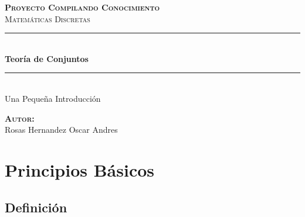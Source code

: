 \documentclass[12pt]{report}                                %
\author{Oscar Andrés Rosas}                                 %
\begin{document}
\begin{titlepage}

	\center
	\textbf{\textsc{\Large Proyecto Compilando Conocimiento}}\\[1.0cm] 
	\textsc{\Large Matemáticas Discretas}\\[1.0cm] 

	\rule{\linewidth}{0.5mm} \\[1.0cm]
		{ \huge \bfseries Teoría de Conjuntos}\\[1.0cm] 
	\rule{\linewidth}{0.5mm} \\[2.0cm]
	
	{\LARGE Una Pequeña Introducción}\\[7cm] 
	
	\begin{center} \large
	\textbf{\textsc{Autor:}}\\
	Rosas Hernandez Oscar Andres
	\end{center}

	\vfill

\end{titlepage}

\tableofcontents{}
\clearpage

\chapter{Principios Básicos}
    \clearpage

    \section{Definición}

\end{document}
